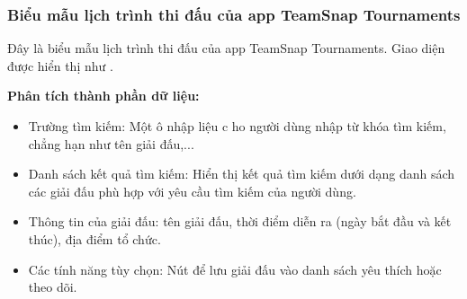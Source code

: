\subsubsection{Biểu mẫu lịch trình thi đấu của app TeamSnap Tournaments}

Đây là biểu mẫu lịch trình thi đấu của app TeamSnap Tournaments.
Giao diện được hiển thị như .
\begin{center}
\end{center}

\noindent
\textbf{Phân tích thành phần dữ liệu:}
\begin{itemize}[leftmargin=1.5cm, label={--}]
  \item Trường tìm kiếm: Một ô nhập liệu c
        ho người dùng nhập từ khóa tìm kiếm, chẳng hạn như tên giải đấu,...
  \item Danh sách kết quả tìm kiếm: Hiển thị kết quả tìm kiếm dưới dạng danh sách các giải đấu phù hợp với yêu cầu tìm kiếm của người dùng.
  \item Thông tin của giải đấu: tên giải đấu, thời điểm diễn ra (ngày bắt đầu và kết thúc), địa điểm tổ chức.
  \item Các tính năng tùy chọn: Nút để lưu giải đấu vào danh sách yêu thích hoặc theo dõi.
\end{itemize}
